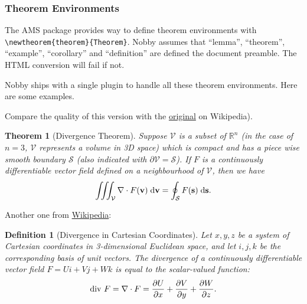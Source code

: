 \documentclass[10pt]{article}
\newtheorem{theorem}{Theorem}
\newtheorem{definition}{Definition}
\newcommand{\mvec}[1]{\mathbf{#1}}
\begin{document}
\subsubsection{Theorem Environments}
The AMS package provides way to define theorem environments with
\texttt{\textbackslash{newtheorem\{theorem\}\{Theorem\}}}. Nobby
assumes that ``lemma'', ``theorem'', ``example'', ``corollary'' and
``definition'' are defined the document preamble. The HTML conversion
will fail if not.

Nobby ships with a single plugin to handle all these theorem
environments. Here are some examples.

Compare the quality of this version with the 
\href{http://en.wikipedia.org/wiki/Divergence_theorem}{original} on
Wikipedia).
\begin{theorem}[Divergence Theorem]
  \label{thm:div}
  Suppose $\mathcal{V}$ is a subset of $\mathbb{R}^n$ (in the case of
  $n=3$, $\mathcal{V}$ represents a volume in 3D space) which is
  compact and has a piece wise smooth boundary $\mathcal{S}$ (also
  indicated with $\partial\mathcal{V} = \mathcal{S}$). If $F$ is a
  continuously differentiable vector field defined on a neighbourhood
  of $\mathcal{V}$, then we have
  \begin{align}
    \iiint_{\mathcal{V}} \nabla \cdot F(\mvec{v})\; \textnormal{d}\mvec{v}
    = \oint_{\mathcal{S}} F(\mvec{s})\; \textnormal{d}\mvec{s}.
  \end{align}
\end{theorem}

Another one from \href{http://en.wikipedia.org/wiki/Divergence}{Wikipedia}:
\begin{definition}[Divergence in Cartesian Coordinates]
  \label{def:div}
  Let $x, y, z$ be a system of Cartesian coordinates in 3-dimensional
  Euclidean space, and let $i, j, k$ be the corresponding basis of unit
  vectors. The divergence of a continuously differentiable vector
  field $F = U i + V j + W k$ is equal to the scalar-valued function:
  \begin{align}
    \textnormal{div } F = \nabla \cdot F = 
    \frac{\partial U}{\partial x} +
    \frac{\partial V}{\partial y} +
    \frac{\partial W}{\partial z}.
  \end{align}
\end{definition}
\end{document}
